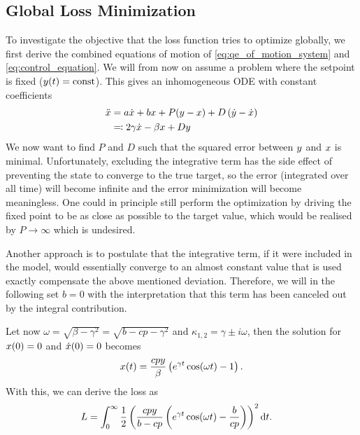 \documentclass{article}
\begin{document}
  \subsection{Global Loss Minimization}
    \label{sq:L2Loss}
    To investigate the objective that the loss function tries to optimize globally, we first derive the combined 
    equations of motion of \eqref{eq:qe_of_motion_system} and \eqref{eq:control_equation}.
    We will from now on assume a problem where the setpoint is fixed ($y(t) = \operatorname{const}$).
    This gives an inhomogeneous ODE with constant coefficients 
    \begin{align}
        \ddot{x} &= a \dot{x} + b x + P (y - x) + D \left( \dot{y} - \dot{x} \right)\\ \nonumber
        &\eqqcolon 2\gamma  \dot{x} - \beta x + D y
    \end{align}
    We now want to find $P$ and $D$ such that the squared error between $y$ and $x$ is minimal.
    Unfortunately, excluding the integrative term has the side effect of preventing the state to converge to the true target, so the error (integrated over all time) will become infinite and the error minimization will become meaningless. 
    One could in principle still perform the optimization by driving the fixed point to be as close as possible to the target value, which would be realised by $P \rightarrow \infty$ which is undesired. 
    
    Another approach is to postulate that the integrative term, if it were included in the model, would essentially converge to an almost constant value that is used exactly compensate the above mentioned deviation.
    Therefore, we will in the following set $b=0$ with the interpretation that this term has been canceled out by the integral contribution.

    Let now $\omega=\sqrt{\beta-\gamma^2} = \sqrt{b - cp - \gamma^2}$ and  $\kappa_{1,2} = \gamma \pm i \omega$, then the solution for 
    $x(0) = 0$ and $\dot{x}(0) = 0$ becomes
    \begin{align}
        x(t) = \frac{c p y}{\beta} \left( e^{\gamma t} \cos(\omega t) - 1 \right).
    \end{align}
    With this, we can derive the loss as 
    \begin{align}
        L &= \int_0^{\infty} \frac{1}{2}\left( \frac{c p y}{b - cp} \left(e^{\gamma t} \cos ( \omega t ) - \frac{b}{c p}\right) \right)^2 \mathrm{d}t.
    \end{align}
    
\end{document}
